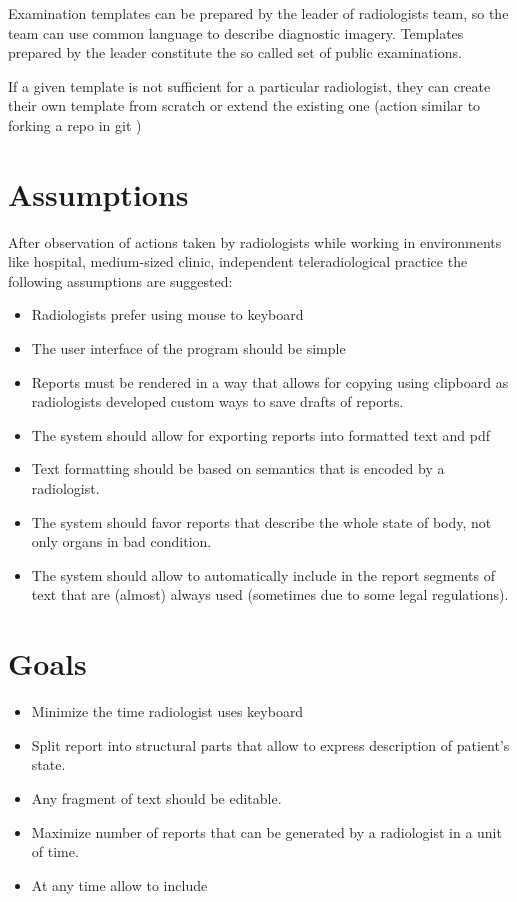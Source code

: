 \documentclass[12pt, twoside, openany]{report}
\theoremstyle{definition}
\begin{document}
Examination templates can be prepared by the leader of radiologists team, so the team can use common language to describe diagnostic imagery. Templates prepared by the leader constitute the so called set of public examinations.

If a given template is not sufficient for a particular radiologist, they can  create their own template from scratch or extend the existing one (action similar to forking a repo in git \cite{forking})


\section{Assumptions}
After observation of actions taken by radiologists while working in environments like hospital, medium-sized clinic, independent teleradiological practice the following assumptions are suggested:
\begin{itemize}
    \item Radiologists prefer using mouse to keyboard
    \item The user interface of the program should be simple 
    \item Reports must be rendered in a way that allows for copying using clipboard as radiologists developed custom ways to save drafts of reports.
    \item The system should allow for exporting reports into formatted text and pdf
    \item Text formatting should be based on semantics that is encoded by a radiologist.
    \item The system should favor reports that describe the whole state of body, not only organs in bad condition.
    \item The system should allow to automatically include in the report segments of text that are (almost) always used (sometimes due to some legal regulations).

\end{itemize}
\section{Goals}
\begin{itemize}
\item Minimize the time radiologist uses keyboard
\item Split report into structural parts that allow to express description of patient's state.
\item Any fragment of text should be editable. 
\item Maximize number of reports that can be generated by a radiologist in a unit of time.
\item At any time allow to include
\end{itemize}
\end{document}
